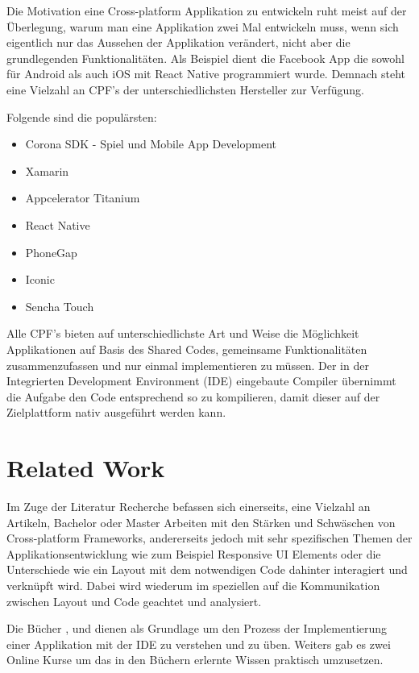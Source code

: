 	\newpage
	Die Motivation eine Cross-platform Applikation zu entwickeln ruht meist auf der Überlegung, warum man eine Applikation zwei Mal entwickeln muss, wenn sich eigentlich nur das Aussehen der Applikation verändert, nicht aber die grundlegenden Funktionalitäten. Als Beispiel dient die Facebook App die sowohl für Android als auch iOS mit React Native programmiert wurde. Demnach steht eine Vielzahl an CPF's der unterschiedlichsten Hersteller zur Verfügung.

	Folgende sind die populärsten:
	\begin{itemize}
		\setlength\itemsep{0em}
		\item Corona SDK - Spiel und Mobile App Development
		\item Xamarin
		\item Appcelerator Titanium
		\item React Native
		\item PhoneGap
		\item Iconic
		\item Sencha Touch
	\end{itemize}

	Alle CPF's bieten auf unterschiedlichste Art und Weise die Möglichkeit Applikationen auf Basis des \grqq Shared Codes\grqq, gemeinsame Funktionalitäten zusammenzufassen und nur einmal implementieren zu müssen. Der in der Integrierten Development Environment (IDE) eingebaute Compiler übernimmt die Aufgabe den Code entsprechend so zu kompilieren, damit dieser auf der Zielplattform nativ ausgeführt werden kann.

\newpage
\section{Related Work}
\label{sec:relatedwork}

Im Zuge der Literatur Recherche befassen sich einerseits, eine Vielzahl an Artikeln, Bachelor oder Master Arbeiten mit den Stärken und Schwäschen von Cross-platform Frameworks, andererseits jedoch mit sehr spezifischen Themen der Applikationsentwicklung wie zum Beispiel Responsive UI Elements oder die Unterschiede wie ein Layout mit dem notwendigen Code dahinter interagiert und verknüpft wird. Dabei wird wiederum im speziellen auf die Kommunikation zwischen Layout und Code geachtet und analysiert.

Die Bücher \cite{book:Xamarin.Forms-Succinctly}, \cite{book:Xamarin.Forms-Essentials:} und \cite{book:Cross-platform-UI-Development-with-Xamarin.Forms} dienen als Grundlage um den Prozess der Implementierung einer Applikation mit der IDE zu verstehen und zu üben. Weiters gab es zwei Online Kurse um das in den Büchern erlernte Wissen praktisch umzusetzen.

